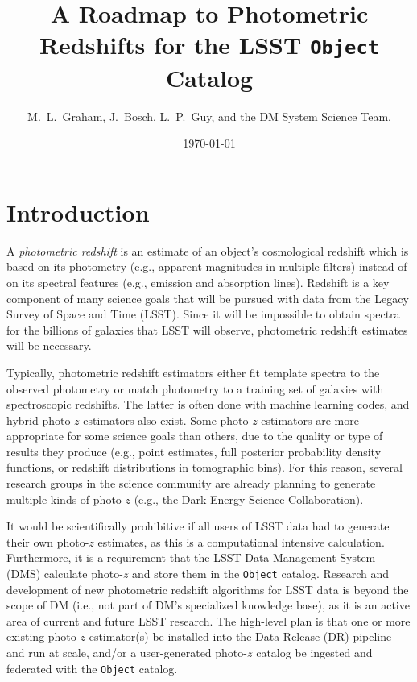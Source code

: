 \documentclass[DM,lsstdraft,toc]{lsstdoc}
\title[Photo-$z$ for LSST Objects]{A Roadmap to Photometric Redshifts for the LSST {\tt Object} Catalog}
\author{M.~L.~Graham, J.~Bosch, L.~P.~Guy, and the DM System Science Team.}
\date{\today}
\begin{document}
\maketitle




\section{Introduction} \label{sec:intro}

A {\it photometric redshift} is an estimate of an object's cosmological redshift which is based on its photometry (e.g., apparent magnitudes in multiple filters) instead of on its spectral features (e.g., emission and absorption lines). 
Redshift is a key component of many science goals that will be pursued with data from the Legacy Survey of Space and Time (LSST).
Since it will be impossible to obtain spectra for the billions of galaxies that LSST will observe, photometric redshift estimates will be necessary.

Typically, photometric redshift estimators either fit template spectra to the observed photometry or match photometry to a training set of galaxies with spectroscopic redshifts. 
The latter is often done with machine learning codes, and hybrid photo-$z$ estimators also exist. 
Some photo-$z$ estimators are more appropriate for some science goals than others, due to the quality or type of results they produce (e.g., point estimates, full posterior probability density functions, or redshift distributions in tomographic bins).
For this reason, several research groups in the science community are already planning to generate multiple kinds of photo-$z$ (e.g., the Dark Energy Science Collaboration).

It would be scientifically prohibitive if all users of LSST data had to generate their own photo-$z$ estimates, as this is a computational intensive calculation.
Furthermore, it is a requirement that the LSST Data Management System (DMS) calculate photo-$z$ and store them in the {\tt Object} catalog.
Research and development of new photometric redshift algorithms for LSST data is beyond the scope of DM (i.e., not part of DM's specialized knowledge base), as it is an active area of current and future LSST research.
The high-level plan is that one or more existing photo-$z$ estimator(s) be installed into the Data Release (DR) pipeline and run at scale, and/or a user-generated photo-$z$ catalog be ingested and federated with the {\tt Object} catalog.
\end{document}
